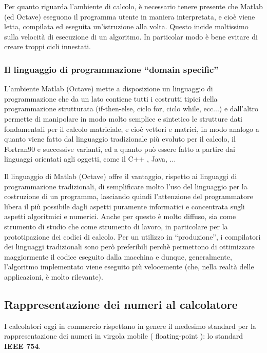 Per quanto riguarda l'ambiente di calcolo, è necessario tenere presente che Matlab (ed Octave) eseguono il programma utente in maniera interpretata, e cioè viene letta, compilata ed eseguita un’istruzione alla volta. Questo incide moltissimo sulla velocità di esecuzione di un algoritmo. In particolar modo è bene evitare di creare troppi cicli innestati.


\subsubsection{Il linguaggio di programmazione ``domain specific''}

L’ambiente Matlab (Octave) mette a disposizione un linguaggio di programmazione che da un lato contiene tutti i costrutti tipici della programmazione strutturata (if-then-else, ciclo for, ciclo while, ecc...) e dall’altro permette di manipolare in modo molto semplice e sintetico le strutture dati fondamentali per il calcolo matriciale, e cioè vettori e matrici, in modo analogo a quanto viene fatto dal linguaggio tradizionale più evoluto per il calcolo, il Fortran90 e successive varianti, ed a quanto può essere fatto a partire dai linguaggi orientati agli oggetti, come il C++ , Java, ...

Il linguaggio di Matlab (Octave) offre il vantaggio, rispetto ai linguaggi di programmazione tradizionali, di semplificare molto l’uso del linguaggio per la costruzione di un programma, lasciando quindi l’attenzione del programmatore libera il più possibile dagli aspetti puramente informatici e concentrata sugli aspetti algoritmici e numerici. Anche per questo è molto diffuso, sia come strumento di studio che come strumento di lavoro, in particolare per la prototipazione dei codici di calcolo. Per un utilizzo in ``produzione'', i compilatori dei linguaggi tradizionali sono però preferibili perchè permettono di ottimizzare maggiormente il codice eseguito dalla macchina e dunque, generalmente, l’algoritmo implementato viene eseguito più velocemente (che, nella realtà delle applicazioni, è molto rilevante).


\subsection{Rappresentazione dei numeri al calcolatore}

I calcolatori oggi in commercio rispettano in genere il medesimo standard per la rappresentazione dei numeri in virgola mobile ( floating-point ): lo standard \textbf{IEEE 754}.

